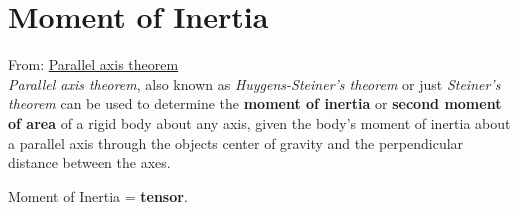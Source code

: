 \documentclass[10pt,b5paper,titlepage]{book}
\begin{document}
\chapter{Moment of Inertia}

From: \href{https://en.wikipedia.org/wiki/Parallel_axis_theorem}{Parallel axis theorem}\\

\textit{Parallel axis theorem}, also known as \textit{Huygens-Steiner's theorem}
or just \textit{Steiner's theorem} can be used to determine the \textbf{moment of inertia}
or \textbf{second moment of area} of a rigid body about any axis, given the body's
moment of inertia about a parallel axis through the objects center of gravity
and the perpendicular distance between the axes.

Moment of Inertia = \textbf{tensor}.
\end{document}
